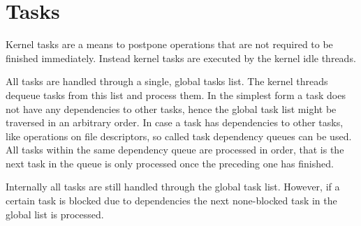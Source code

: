 %
%
%



\section{Tasks}
Kernel tasks are a means to postpone operations that are not required to be finished immediately. Instead kernel tasks are executed by the kernel idle threads.

All tasks are handled through a single, global tasks list. The kernel threads dequeue tasks from this list and process them. In the simplest form a task does not have any dependencies to other tasks, hence the global task list might be traversed in an arbitrary order. In case a task has dependencies to other tasks, like operations on file descriptors, so called task dependency queues can be used. All tasks within the same dependency queue are processed in order, that is the next task in the queue is only processed once the preceding one has finished.

Internally all tasks are still handled through the global task list. However, if a certain task is blocked due to dependencies the next none-blocked task in the global list is processed.
